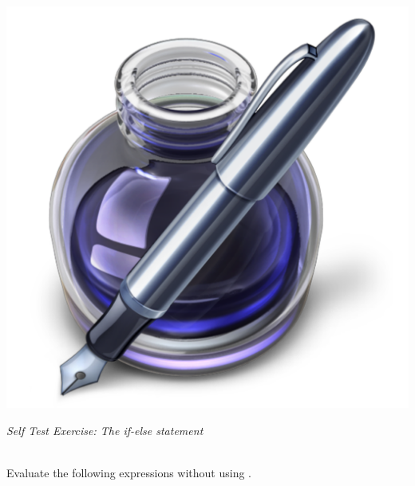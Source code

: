 \newpage
\addtolength{\parindent}{-4mm}
\begin{minipage}{\linewidth}
\begin{minipage}{6mm}
\includegraphics[scale=0.035]{Graphics/General/exercise_icon}
\end{minipage}
\textit{Self Test Exercise: The if-else statement}
\end{minipage}
\addtolength{\parindent}{4mm}
\\ Evaluate the following expressions without using \mlab.
